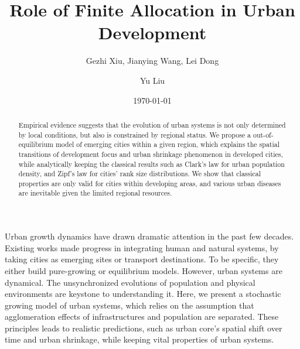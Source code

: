 \documentclass[reprint,unsortedaddress,amsmath,amssymb,aps,prl,showkeys]{revtex4-2}
\begin{document}
\title{Role of Finite Allocation in Urban Development}
\author{Gezhi Xiu, Jianying Wang, Lei Dong}
\author{Yu Liu}
\date{\today}

\begin{abstract}
	Empirical evidence suggests that the evolution of urban systems is not only determined by local conditions, but also is constrained by regional status. We propose a out-of-equilibrium model of emerging cities within a given region, which explains the spatial transitions of development focus and urban shrinkage phenomenon in developed cities, while analytically keeping the classical results such as Clark's law for urban population density, and Zipf's law for cities' rank size distributions. We show that classical properties are only valid for cities within developing areas, and various urban diseases are inevitable given the limited regional resources. 
\end{abstract}

\maketitle

Urban growth dynamics have drawn dramatic attention in the past few decades\cite{PhysRevLett.79.523,foster2010communities,PhysRevX.4.011008}. Existing works made progress in integrating human and natural systems, by taking cities as emerging sites or transport destinations\cite{Liu1258832}. To be specific, they either build pure-growing or equilibrium models. However, urban systems are dynamical. The unsynchronized evolutions of population and physical environments are keystone to understanding it\cite{doi:10.1177/0042098010396239,gu2001social}. Here, we present a stochastic growing model of urban systems, which relies on the assumption that agglomeration effects of infrastructures and population are separated. These principles  leads to realistic predictions, such as urban core's spatial shift over time and urban shrinkage, while keeping vital properties\cite{gabaix1999zipf's,clark1951urban} of urban systems. 
\end{document}
